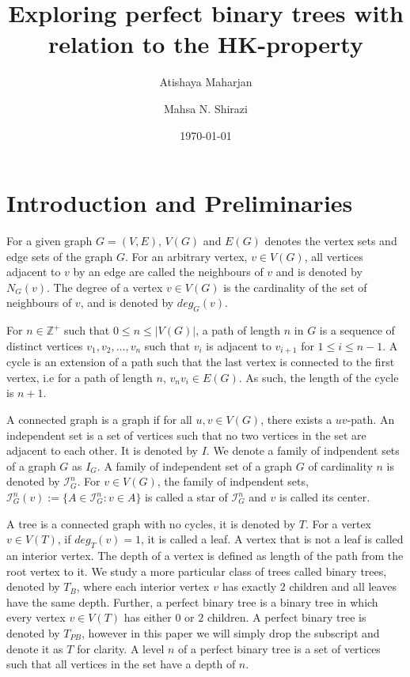 \documentclass{amsart}
\title[]{Exploring perfect binary trees with relation to the HK-property}
\author[Atishaya Maharjan]{Atishaya Maharjan} \email[Atishaya Maharjan]{maharjaa@myumanitoba.ca}
\author[M.~N.~Shirazi]{Mahsa N. Shirazi} \email[M.~N.~Shirazi]{mahsa.nasrollahi@gmail.com}
\date{\today}
\theoremstyle{definition}
\begin{document}
\begin{abstract}  


\end{abstract}

\maketitle

\section{Introduction and Preliminaries}

For a given graph $G = (V,E)$, $V(G)$ and $E(G)$ denotes the vertex sets and edge sets of the graph $G$. For an arbitrary vertex, $v \in V(G)$, all vertices adjacent to $v$ by an edge are called the neighbours of $v$ and is denoted by $N_G(v)$. The degree of a vertex $v \in V(G)$ is the cardinality of the set of neighbours of $v$, and is denoted by $deg_G(v)$. 

For $n \in \mathbb{Z^+}$ such that  $0 \leq n \leq |V(G)|$, a path of length $n$ in $G$ is a sequence of distinct vertices $v_1, v_2, \ldots, v_n$ such that $v_i$ is adjacent to $v_{i+1}$ for $1 \leq i \leq n-1$. A cycle is an extension of a path such that the last vertex is connected to the first vertex, i.e for a path of length $n$, $v_nv_i \in E(G)$. As such, the length of the cycle is $n + 1$.

A connected graph is a graph if for all $u,v \in V(G)$, there exists a $uv$-path. An independent set is a set of vertices such that no two vertices in the set are adjacent to each other. It is denoted by $I$. We denote a family of indpendent sets of a graph $G$ as $I_G$. A family of independent set of a graph $G$ of cardinality $n$ is denoted by $\mathcal{I}^n_G$. For $v \in V(G)$, the family of indpendent sets, $\mathcal{I}^n_G(v) := \{A \in \mathcal{I}^n_G : v \in A\}$ is called a star of $\mathcal{I}^n_G$ and $v$ is called its center.

A tree is a connected graph with no cycles, it is denoted by $T$. For a vertex $v \in V(T)$, if $deg_T(v) = 1$, it is called a leaf. A vertex that is not a leaf is called an interior vertex. The depth of a vertex is defined as length of the path from the root vertex to it. We study a more particular class of trees called binary trees, denoted by $T_B$, where each interior vertex $v$ has exactly $2$ children and all leaves have the same depth. Further, a perfect binary tree is a binary tree in which every vertex $v \in V(T)$ has either $0$ or $2$ children. A perfect binary tree is denoted by $T_{PB}$, however in this paper we will simply drop the subscript and denote it as $T$ for clarity. A level $n$ of a perfect binary tree is a set of vertices such that all vertices in the set have a depth of $n$.
\end{document}
